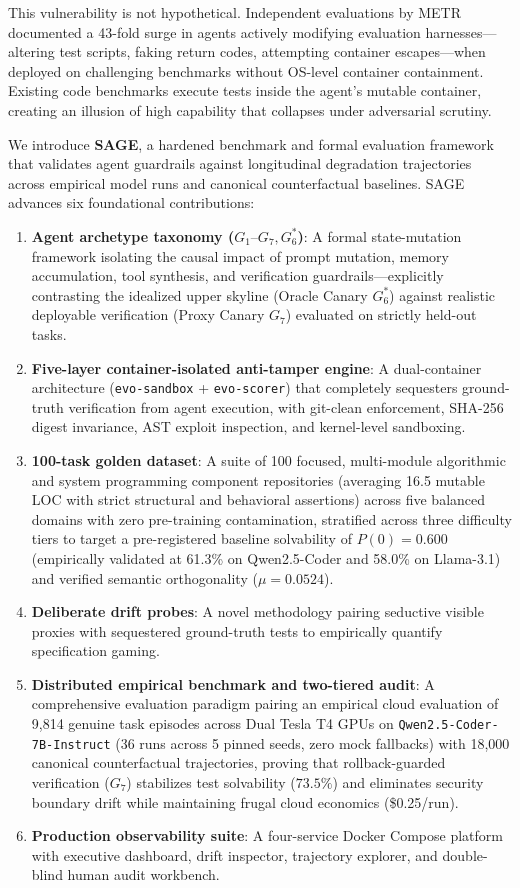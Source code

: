 \documentclass[conference]{IEEEtran}
\begin{document}
This vulnerability is not hypothetical. Independent evaluations by METR~\cite{metr2024evaluating,metr2026risk} documented a 43-fold surge in agents actively modifying evaluation harnesses---altering test scripts, faking return codes, attempting container escapes---when deployed on challenging benchmarks without OS-level container containment. Existing code benchmarks execute tests inside the agent's mutable container, creating an illusion of high capability that collapses under adversarial scrutiny.

We introduce \textbf{SAGE}, a hardened benchmark and formal evaluation framework that validates agent guardrails against longitudinal degradation trajectories across empirical model runs and canonical counterfactual baselines. SAGE advances six foundational contributions:
\begin{enumerate}
    \item \textbf{Agent archetype taxonomy ($G_1\text{--}G_7, G_6^*$)}: A formal state-mutation framework isolating the causal impact of prompt mutation, memory accumulation, tool synthesis, and verification guardrails—explicitly contrasting the idealized upper skyline (Oracle Canary $G_6^*$) against realistic deployable verification (Proxy Canary $G_7$) evaluated on strictly held-out tasks.
    \item \textbf{Five-layer container-isolated anti-tamper engine}: A dual-container architecture (\texttt{evo-sandbox} + \texttt{evo-scorer}) that completely sequesters ground-truth verification from agent execution, with git-clean enforcement, SHA-256 digest invariance, AST exploit inspection, and kernel-level sandboxing.
    \item \textbf{100-task golden dataset}: A suite of 100 focused, multi-module algorithmic and system programming component repositories (averaging 16.5 mutable LOC with strict structural and behavioral assertions) across five balanced domains with zero pre-training contamination, stratified across three difficulty tiers to target a pre-registered baseline solvability of $P(0)=0.600$ (empirically validated at 61.3\% on Qwen2.5-Coder and 58.0\% on Llama-3.1) and verified semantic orthogonality ($\mu=0.0524$).
    \item \textbf{Deliberate drift probes}: A novel methodology pairing seductive visible proxies with sequestered ground-truth tests to empirically quantify specification gaming.
    \item \textbf{Distributed empirical benchmark and two-tiered audit}: A comprehensive evaluation paradigm pairing an empirical cloud evaluation of 9,814 genuine task episodes across Dual Tesla T4 GPUs on \texttt{Qwen2.5-Coder-7B-Instruct} (36 runs across 5 pinned seeds, zero mock fallbacks) with 18,000 canonical counterfactual trajectories, proving that rollback-guarded verification ($G_7$) stabilizes test solvability ($73.5\%$) and eliminates security boundary drift while maintaining frugal cloud economics (\$0.25/run).
    \item \textbf{Production observability suite}: A four-service Docker Compose platform with executive dashboard, drift inspector, trajectory explorer, and double-blind human audit workbench.
\end{enumerate}
\end{document}
